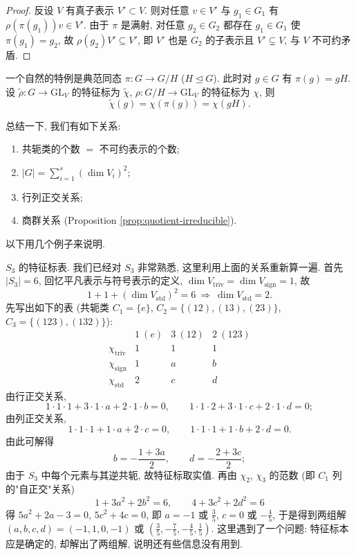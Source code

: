 \begin{proof}
反设 $V$ 有真子表示 $V'\subset V$. 则对任意 $v\in V'$ 与 $g_1\in G_1$ 有
$\rho(\pi(g_1))v\in V'$. 由于 $\pi$ 是满射, 对任意 $g_2\in G_2$ 都存在 $g_1\in G_1$
使 $\pi(g_1)=g_2$, 故 $\rho(g_2)V'\subseteq V'$, 即 $V'$ 也是 $G_2$ 的子表示且
$V'\subsetneq V$, 与 $V$ 不可约矛盾.
\end{proof}

一个自然的特例是典范同态 $\pi\colon G\to G/H$ ($H\trianglelefteq G$). 此时对
$g\in G$ 有 $\pi(g)=gH$. 设 $\tilde\rho\colon G\to\mathrm{GL}_V$ 的特征标为 $\tilde\chi$,
$\rho\colon G/H\to\mathrm{GL}_V$ 的特征标为 $\chi$, 则
\[
  \tilde\chi(g)=\chi(\pi(g))=\chi(gH).
\]

总结一下, 我们有如下关系:
\begin{enumerate}
  \item 共轭类的个数 $=$ 不可约表示的个数;
  \item $|G|=\sum_{i=1}^{s}(\dim V_i)^2$;
  \item 行列正交关系;
  \item 商群关系 (Proposition \ref{prop:quotient-irreducible}).
\end{enumerate}
以下用几个例子来说明.

\begin{example}\label{ex:S3-character-table}
$S_3$ 的特征标表. 我们已经对 $S_3$ 非常熟悉, 这里利用上面的关系重新算一遍.
首先 $|S_3|=6$, 回忆平凡表示与符号表示的定义,
$\dim V_{\mathrm{triv}}=\dim V_{\mathrm{sign}}=1$, 故
\[
  1+1+(\dim V_{\mathrm{std}})^2=6 \ \Longrightarrow\ \dim V_{\mathrm{std}}=2 .
\]
先写出如下的表 (共轭类 $C_1=\{e\}$, $C_2=\{(12),(13),(23)\}$,
$C_3=\{(123),(132)\}$):
\[
\begin{array}{c|ccc}
  & 1\ (e) & 3\ (12) & 2\ (123)\\ \hline
  \chi_{\mathrm{triv}} & 1 & 1 & 1\\
  \chi_{\mathrm{sign}} & 1 & a & b\\
  \chi_{\mathrm{std}}  & 2 & c & d
\end{array}
\]
由行正交关系,
\[
  1\cdot1\cdot1+3\cdot1\cdot a+2\cdot1\cdot b=0,\qquad
  1\cdot1\cdot2+3\cdot1\cdot c+2\cdot1\cdot d=0;
\]
由列正交关系,
\[
  1\cdot1\cdot1+1\cdot a+2\cdot c=0,\qquad
  1\cdot1\cdot1+1\cdot b+2\cdot d=0 .
\]
由此可解得
\[
  b=-\frac{1+3a}{2},\qquad d=-\frac{2+3c}{2};
\]
由于 $S_3$ 中每个元素与其逆共轭, 故特征标取实值. 再由 $\chi_2$, $\chi_3$ 的范数 (即 $C_1$ 列的"自正交"关系)
\[
  1+3a^2+2b^2=6,\qquad 4+3c^2+2d^2=6
\]
得 $5a^2+2a-3=0$, $5c^2+4c=0$, 即 $a=-1$ 或 $\frac35$, $c=0$ 或 $-\frac45$, 于是得到两组解
$(a,b,c,d)=(-1,1,0,-1)$ 或 $(\frac35,-\frac75,-\frac45,\frac15)$. 这里遇到了一个问题: 特征标本应是确定的,
却解出了两组解, 说明还有些信息没有用到.
\end{example}

